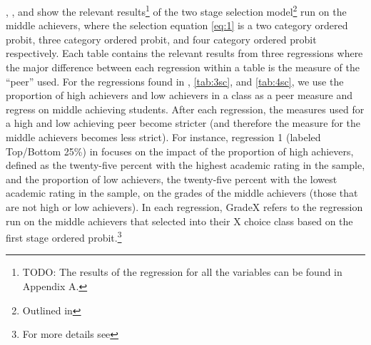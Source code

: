 , , and  show the relevant results\footnote{TODO: The results of the regression for all the variables can be found in Appendix A.} of the two stage selection model\footnote{Outlined in } run on the middle achievers, where the selection equation \eqref{eq:1} is a two category ordered probit, three category ordered probit, and four category ordered probit respectively. 
Each table contains the relevant results from three regressions where the major difference between each regression within a table is the measure of the ``peer'' used. 
For the regressions found in , \ref{tab:3sc}, and \ref{tab:4sc}, we use the proportion of high achievers and low achievers in a class as a peer measure and regress on middle achieving students. 
After each regression, the measures used for a high and low achieving peer become stricter (and therefore the measure for the middle achievers becomes less strict). 
For instance, regression 1 (labeled Top/Bottom 25\%) in  focuses on the impact of the proportion of high achievers, defined as the twenty-five percent with the highest academic rating in the sample, and the proportion of low achievers, the twenty-five percent with the lowest academic rating in the sample, on the grades of the middle achievers (those that are not high or low achievers). 
In each regression, GradeX refers to the regression run on the middle achievers that selected into their X choice class based on the first stage ordered probit.\footnote{For more details see } 

\clearpage{}

